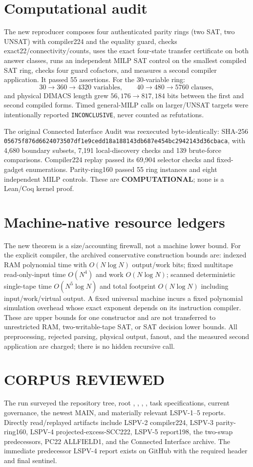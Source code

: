 \documentclass[11pt]{article}
\begin{document}
\section{Computational audit}
The new reproducer composes four authenticated parity rings (two SAT, two UNSAT) with compiler224 and the equality guard, checks exact22/connectivity/counts, uses the exact four-state transfer certificate on both answer classes, runs an independent MILP SAT control on the smallest compiled SAT ring, checks four guard cofactors, and measures a second compiler application.  It passed 55 assertions.  For the 30-variable ring:
\[
 30\to360\to4320\text{ variables},\qquad
 40\to480\to5760\text{ clauses},
\]
and physical DIMACS length grew $56{,}176\to817{,}184$ bits between the first and second compiled forms.  Timed general-MILP calls on larger/UNSAT targets were intentionally reported \texttt{INCONCLUSIVE}, never counted as refutations.

The original Connected Interface Audit was reexecuted byte-identically: SHA-256
\texttt{05675f876d6624073507df1e9cedd18a188143db687e454bc2942143d36cbaca}, with 4,680 boundary subsets, 7,191 local-discovery checks and 139 brute-force comparisons.  Compiler224 replay passed its 69,904 selector checks and fixed-gadget enumerations.  Parity-ring160 passed 55 ring instances and eight independent MILP controls.  These are \textbf{COMPUTATIONAL}; none is a Lean/Coq kernel proof.

\section{Machine-native resource ledgers}
The new theorem is a size/accounting firewall, not a machine lower bound.  For the explicit compiler, the archived conservative construction bounds are: indexed RAM polynomial time with $O(N\log N)$ output/work bits; fixed multitape read-only-input time $O(N^4)$ and work $O(N\log N)$; scanned deterministic single-tape time $O(N^5\log N)$ and total footprint $O(N\log N)$ including input/work/virtual output.  A fixed universal machine incurs a fixed polynomial simulation overhead whose exact exponent depends on its instruction compiler.  These are upper bounds for one constructor and are not transferred to unrestricted RAM, two-writable-tape SAT, or SAT decision lower bounds.  All preprocessing, rejected parsing, physical output, fanout, and the measured second application are charged; there is no hidden recursive call.

\section{CORPUS REVIEWED}
The run surveyed the repository tree, root , , , , task specifications, current governance, the newest MAIN, and materially relevant LSPV-1--5 reports.  Directly read/replayed artifacts include LSPV-2 compiler224, LSPV-3 parity-ring160, LSPV-4 projected-excess-SCC222, LSPV-5 report198, the two-swap predecessors, PC22 ALLFIELD1, and the Connected Interface archive.  The immediate predecessor LSPV-4 report exists on GitHub with the required header and final sentinel.
\end{document}
